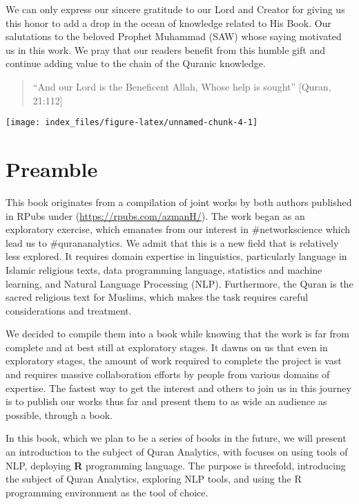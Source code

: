 \documentclass[
]{article}
\begin{document}
We can only express our sincere gratitude to our Lord and Creator for giving us this honor to add a drop in the ocean of knowledge related to His Book. Our salutations to the beloved Prophet Muhammad (SAW) whose saying motivated us in this work. We pray that our readers benefit from this humble gift and continue adding value to the chain of the Quranic knowledge.

\begin{quote}
``And our Lord is the Beneficent Allah, Whose help is sought'' {[}Quran, 21:112{]}
\end{quote}

\begin{center}\texttt{[image: index\_files/figure-latex/unnamed-chunk-4-1]} \end{center}

\hypertarget{preamble}{%
\section*{Preamble}\label{preamble}}

This book originates from a compilation of joint works by both authors published in RPubs under (\url{https://rpubs.com/azmanH/}). The work began as an exploratory exercise, which emanates from our interest in \#networkscience which lead us to \#qurananalytics. We admit that this is a new field that is relatively less explored. It requires domain expertise in linguistics, particularly language in Islamic religious texts, data programming language, statistics and machine learning, and Natural Language Processing (NLP). Furthermore, the Quran is the sacred religious text for Muslims, which makes the task requires careful considerations and treatment.

We decided to compile them into a book while knowing that the work is far from complete and at best still at exploratory stages. It dawns on us that even in exploratory stages, the amount of work required to complete the project is vast and requires massive collaboration efforts by people from various domains of expertise. The fastest way to get the interest and others to join us in this journey is to publish our works thus far and present them to as wide an audience as possible, through a book.

In this book, which we plan to be a series of books in the future, we will present an introduction to the subject of Quran Analytics, with focuses on using tools of NLP, deploying \textbf{R} programming language. The purpose is threefold, introducing the subject of Quran Analytics, exploring NLP tools, and using the R programming environment as the tool of choice.
\end{document}
